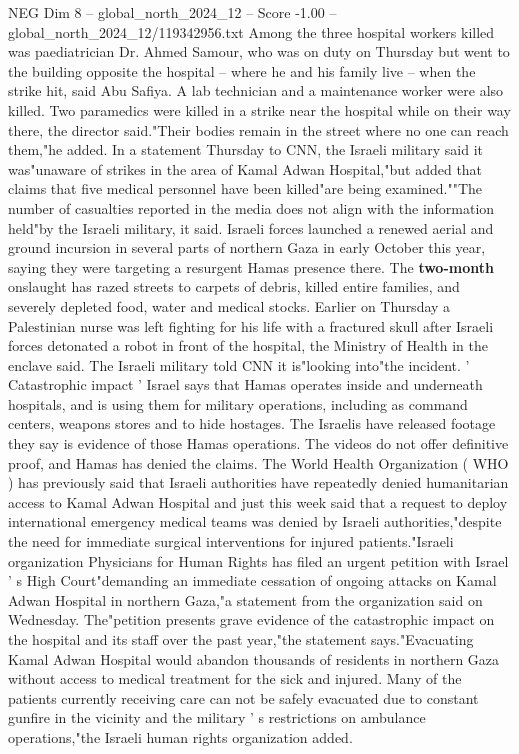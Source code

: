 \begin{textsample}{NEG Dim 8 – global\_north\_2024\_12 – Score -1.00 – global\_north\_2024\_12/119342956.txt}
Among the three hospital workers killed was paediatrician Dr.
Ahmed Samour, who was on duty on Thursday but went to the building opposite the hospital -- where he and his family live -- when the strike hit, said Abu Safiya.
A lab technician and a maintenance worker were also killed.
Two paramedics were killed in a strike near the hospital while on their way there, the director said."Their bodies remain in the street where no one can reach them,"he added.
In a statement Thursday to CNN, the Israeli military said it was"unaware of strikes in the area of Kamal Adwan Hospital,"but added that claims that five medical personnel have been killed"are being examined.""The number of casualties reported in the media does not align with the information held"by the Israeli military, it said.
Israeli forces launched a renewed aerial and ground incursion in several parts of northern Gaza in early October this year, saying they were targeting a resurgent Hamas presence there.
The \textbf{two-month} onslaught has razed streets to carpets of debris, killed entire families, and severely depleted food, water and medical stocks.
Earlier on Thursday a Palestinian nurse was left fighting for his life with a fractured skull after Israeli forces detonated a robot in front of the hospital, the Ministry of Health in the enclave said.
The Israeli military told CNN it is"looking into"the incident. ' Catastrophic impact ' Israel says that Hamas operates inside and underneath hospitals, and is using them for military operations, including as command centers, weapons stores and to hide hostages.
The Israelis have released footage they say is evidence of those Hamas operations.
The videos do not offer definitive proof, and Hamas has denied the claims.
The World Health Organization ( WHO ) has previously said that Israeli authorities have repeatedly denied humanitarian access to Kamal Adwan Hospital and just this week said that a request to deploy international emergency medical teams was denied by Israeli authorities,"despite the need for immediate surgical interventions for injured patients."Israeli organization Physicians for Human Rights has filed an urgent petition with Israel ' s High Court"demanding an immediate cessation of ongoing attacks on Kamal Adwan Hospital in northern Gaza,"a statement from the organization said on Wednesday.
The"petition presents grave evidence of the catastrophic impact on the hospital and its staff over the past year,"the statement says."Evacuating Kamal Adwan Hospital would abandon thousands of residents in northern Gaza without access to medical treatment for the sick and injured.
Many of the patients currently receiving care can not be safely evacuated due to constant gunfire in the vicinity and the military ' s restrictions on ambulance operations,"the Israeli human rights organization added.

\end{textsample}
